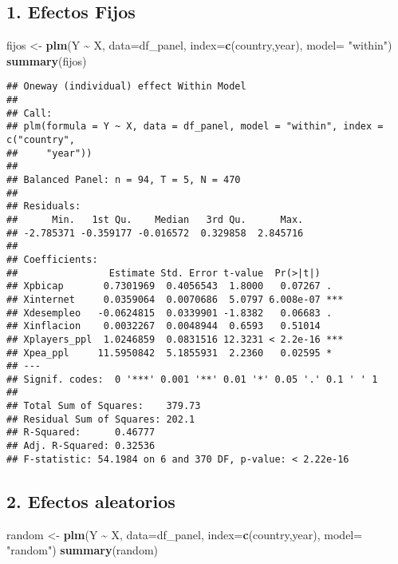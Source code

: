 \documentclass[
]{article}
\newenvironment{Shaded}{\begin{snugshade}}{\end{snugshade}}
\newcommand{\AttributeTok}[1]{\textcolor[rgb]{0.13,0.29,0.53}{#1}}
\newcommand{\FunctionTok}[1]{\textcolor[rgb]{0.13,0.29,0.53}{\textbf{#1}}}
\newcommand{\NormalTok}[1]{#1}
\newcommand{\OtherTok}[1]{\textcolor[rgb]{0.56,0.35,0.01}{#1}}
\newcommand{\SpecialCharTok}[1]{\textcolor[rgb]{0.81,0.36,0.00}{\textbf{#1}}}
\newcommand{\StringTok}[1]{\textcolor[rgb]{0.31,0.60,0.02}{#1}}
\begin{document}
\subsection{1. Efectos Fijos}\label{efectos-fijos}

\begin{Shaded}
\begin{Highlighting}[]
\NormalTok{fijos }\OtherTok{\textless{}{-}} \FunctionTok{plm}\NormalTok{(Y }\SpecialCharTok{\textasciitilde{}}\NormalTok{ X, }\AttributeTok{data=}\NormalTok{df\_panel, }\AttributeTok{index=}\FunctionTok{c}\NormalTok{(}\StringTok{\textquotesingle{}country\textquotesingle{}}\NormalTok{,}\StringTok{\textquotesingle{}year\textquotesingle{}}\NormalTok{), }\AttributeTok{model=} \StringTok{"within"}\NormalTok{)}
\FunctionTok{summary}\NormalTok{(fijos)}
\end{Highlighting}
\end{Shaded}

\begin{verbatim}
## Oneway (individual) effect Within Model
## 
## Call:
## plm(formula = Y ~ X, data = df_panel, model = "within", index = c("country", 
##     "year"))
## 
## Balanced Panel: n = 94, T = 5, N = 470
## 
## Residuals:
##      Min.   1st Qu.    Median   3rd Qu.      Max. 
## -2.785371 -0.359177 -0.016572  0.329858  2.845716 
## 
## Coefficients:
##                Estimate Std. Error t-value  Pr(>|t|)    
## Xpbicap       0.7301969  0.4056543  1.8000   0.07267 .  
## Xinternet     0.0359064  0.0070686  5.0797 6.008e-07 ***
## Xdesempleo   -0.0624815  0.0339901 -1.8382   0.06683 .  
## Xinflacion    0.0032267  0.0048944  0.6593   0.51014    
## Xplayers_ppl  1.0246859  0.0831516 12.3231 < 2.2e-16 ***
## Xpea_ppl     11.5950842  5.1855931  2.2360   0.02595 *  
## ---
## Signif. codes:  0 '***' 0.001 '**' 0.01 '*' 0.05 '.' 0.1 ' ' 1
## 
## Total Sum of Squares:    379.73
## Residual Sum of Squares: 202.1
## R-Squared:      0.46777
## Adj. R-Squared: 0.32536
## F-statistic: 54.1984 on 6 and 370 DF, p-value: < 2.22e-16
\end{verbatim}

\subsection{2. Efectos aleatorios}\label{efectos-aleatorios}

\begin{Shaded}
\begin{Highlighting}[]
\NormalTok{random }\OtherTok{\textless{}{-}} \FunctionTok{plm}\NormalTok{(Y }\SpecialCharTok{\textasciitilde{}}\NormalTok{ X, }\AttributeTok{data=}\NormalTok{df\_panel, }\AttributeTok{index=}\FunctionTok{c}\NormalTok{(}\StringTok{\textquotesingle{}country\textquotesingle{}}\NormalTok{,}\StringTok{\textquotesingle{}year\textquotesingle{}}\NormalTok{), }\AttributeTok{model=} \StringTok{"random"}\NormalTok{)}
\FunctionTok{summary}\NormalTok{(random)}
\end{Highlighting}
\end{Shaded}
\end{document}
